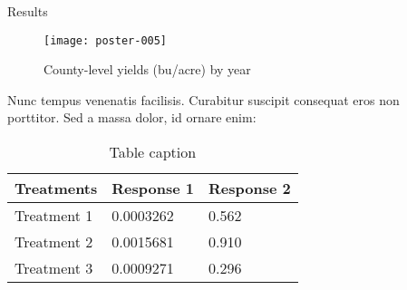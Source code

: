\documentclass[final]{beamer}
\newlength{\sepwid}
\newlength{\onecolwid}
\newlength{\twocolwid}
\begin{document}
\begin{frame}[t]
\begin{columns}[t]
\begin{column}{\twocolwid}
\begin{columns}[t,totalwidth=\twocolwid]
\begin{column}{\onecolwid}

\end{column} %

\begin{column}{\onecolwid} %


\begin{block}{Results}

\begin{figure}
\texttt{[image: poster-005]}

\caption{County-level yields (bu/acre) by year}
\end{figure}

Nunc tempus venenatis facilisis. Curabitur suscipit consequat eros non porttitor. Sed a massa dolor, id ornare enim:

\begin{table}
\vspace{2ex}
\begin{tabular}{l l l}
\toprule
\textbf{Treatments} & \textbf{Response 1} & \textbf{Response 2}\\
\midrule
Treatment 1 & 0.0003262 & 0.562 \\
Treatment 2 & 0.0015681 & 0.910 \\
Treatment 3 & 0.0009271 & 0.296 \\
\bottomrule
\end{tabular}
\caption{Table caption}
\end{table}

\end{block}


\end{column} %

\end{columns} %

\end{column} %

\begin{column}{\sepwid}\end{column} %


\end{columns}
\end{frame}
\end{document}
